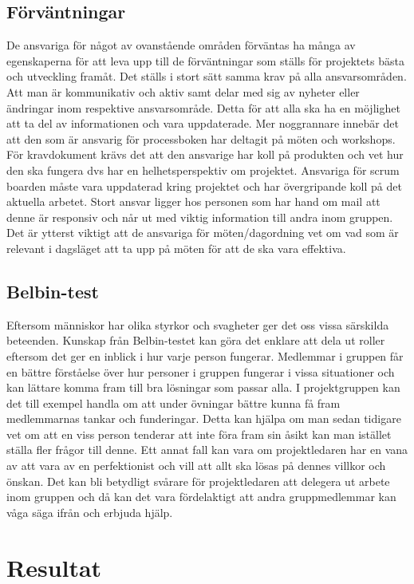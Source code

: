 \documentclass{article}
\begin{document}
\subsection{Förväntningar}

De ansvariga för något av ovanstående områden förväntas ha många av egenskaperna för att
leva upp till de förväntningar som ställs för projektets bästa och utveckling framåt. Det ställs i
stort sätt samma krav på alla ansvarsområden. Att man är kommunikativ och aktiv samt delar
med sig av nyheter eller ändringar inom respektive ansvarsområde. Detta för att alla ska ha en
möjlighet att ta del av informationen och vara uppdaterade. Mer noggrannare innebär det att
den som är ansvarig för processboken har deltagit på möten och workshops. För
kravdokument krävs det att den ansvarige har koll på produkten och vet hur den ska fungera
dvs har en helhetsperspektiv om projektet. Ansvariga för scrum boarden måste vara
uppdaterad kring projektet och har övergripande koll på det aktuella arbetet. Stort ansvar
ligger hos personen som har hand om mail att denne är responsiv och når ut med viktig
information till andra inom gruppen. Det är ytterst viktigt att de ansvariga för
möten/dagordning vet om vad som är relevant i dagsläget att ta upp på möten för att de ska
vara effektiva.

\subsection{Belbin-test}

Eftersom människor har olika styrkor och svagheter ger det oss vissa särskilda beteenden.
Kunskap från Belbin-testet kan göra det enklare att dela ut roller eftersom det ger en inblick i
hur varje person fungerar. Medlemmar i gruppen får en bättre förståelse över hur personer i
gruppen fungerar i vissa situationer och kan lättare komma fram till bra lösningar som passar
alla. I projektgruppen kan det till exempel handla om att under övningar bättre kunna få fram
medlemmarnas tankar och funderingar. Detta kan hjälpa om man sedan tidigare vet om att en
viss person tenderar att inte föra fram sin åsikt kan man istället ställa fler frågor till denne. Ett
annat fall kan vara om projektledaren har en vana av att vara av en perfektionist och vill att
allt ska lösas på dennes villkor och önskan. Det kan bli betydligt svårare för projektledaren att
delegera ut arbete inom gruppen och då kan det vara fördelaktigt att andra gruppmedlemmar
kan våga säga ifrån och erbjuda hjälp.
\section{Resultat}
\end{document}
